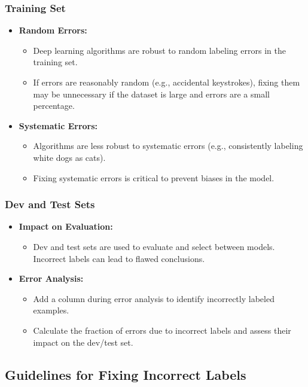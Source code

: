 \documentclass[letterpaper,12pt,notitlepage,twoside]{report}
\begin{document}
\subsubsection{Training Set}
\begin{itemize}
    \item \textbf{Random Errors:}
    \begin{itemize}
        \item Deep learning algorithms are robust to random labeling errors in the training set.
        \item If errors are reasonably random (e.g., accidental keystrokes), fixing them may be unnecessary if the dataset is large and errors are a small percentage.
    \end{itemize}
    \item \textbf{Systematic Errors:}
    \begin{itemize}
        \item Algorithms are less robust to systematic errors (e.g., consistently labeling white dogs as cats).
        \item Fixing systematic errors is critical to prevent biases in the model.
    \end{itemize}
\end{itemize}

\subsubsection{Dev and Test Sets}
\begin{itemize}
    \item \textbf{Impact on Evaluation:}
    \begin{itemize}
        \item Dev and test sets are used to evaluate and select between models. Incorrect labels can lead to flawed conclusions.
    \end{itemize}
    \item \textbf{Error Analysis:}
    \begin{itemize}
        \item Add a column during error analysis to identify incorrectly labeled examples.
        \item Calculate the fraction of errors due to incorrect labels and assess their impact on the dev/test set.
    \end{itemize}
\end{itemize}

\subsection*{Guidelines for Fixing Incorrect Labels}
\end{document}
